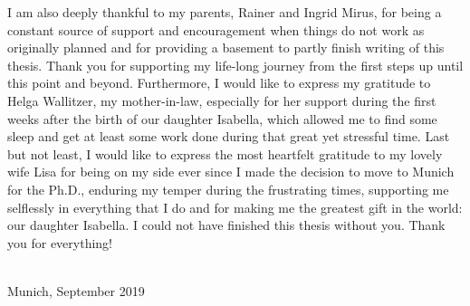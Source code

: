 I am also deeply thankful to my parents, Rainer and Ingrid Mirus, for being a constant source of support and encouragement when things do not work as originally planned and for providing a basement to partly finish writing of this thesis.
Thank you for supporting my life-long journey from the first steps up until this point and beyond.
Furthermore, I would like to express my gratitude to Helga Wallitzer, my mother-in-law, especially for her support during the first weeks after the birth of our daughter Isabella, which allowed me to find some sleep and get at least some work done during that great yet stressful time.
Last but not least, I would like to express the most heartfelt gratitude to  my lovely wife Lisa for being on my side ever since I made the decision to move to Munich for the Ph.D., enduring my temper during the frustrating times, supporting me selflessly in everything that I do and for making me the greatest gift in the world: our daughter Isabella.
I could not have finished this thesis without you.
Thank you for everything! 

\vspace{1cm}
\fullname\\
Munich, September 2019
